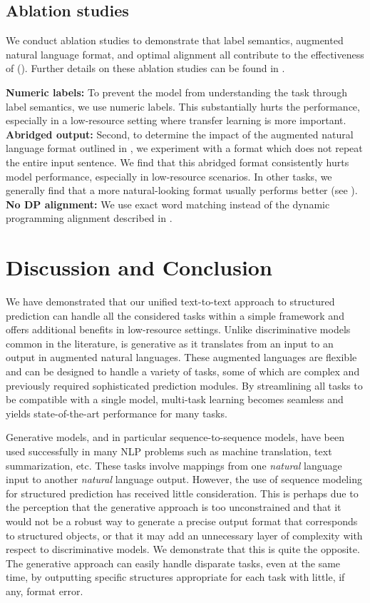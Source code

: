 \subsection{Ablation studies} \label{sec:exp_ablation}
We conduct ablation studies to demonstrate that label semantics, augmented natural language format, and optimal alignment all contribute to the effectiveness of \ourmodel{} ().
Further details on these ablation studies can be found in .

\textbf{Numeric labels:} To prevent the model from understanding the task through label semantics, we use numeric labels. This substantially hurts the performance, especially in a low-resource setting where transfer learning is more important.
\textbf{Abridged output:} Second, to determine the impact of the augmented natural language format outlined in , we experiment with a format which does not repeat the entire input sentence.
We find that this abridged format consistently hurts model performance, especially in low-resource scenarios. 
In other tasks, we generally find that a more natural-looking format usually performs better (see ).
\textbf{No DP alignment:} We use exact word matching instead of the dynamic programming alignment described in .

\section{Discussion and Conclusion} \label{sec:discussion}

We have demonstrated that our unified text-to-text approach to structured prediction can handle all the considered tasks within a simple framework and offers additional benefits in low-resource settings.
Unlike discriminative models common in the literature, \ourmodel{} is generative as it translates from an input to an output in augmented natural languages.
These augmented languages are flexible and can be designed to handle a variety of tasks, some of which are complex and previously required sophisticated prediction modules. %
By streamlining all tasks to be compatible with a single model, multi-task learning becomes seamless and yields state-of-the-art performance for many tasks.

Generative models, and in particular sequence-to-sequence models, have been used successfully in many NLP problems such as machine translation, text summarization, etc. %
These tasks involve mappings from one \emph{natural} language input to another \emph{natural} language output. %
However, the use of sequence modeling for structured prediction has received little consideration.
This is perhaps due to the perception that the generative approach is too unconstrained and that it would not be a robust way to generate a precise output format that corresponds to structured objects, or that it may add an unnecessary layer of complexity with respect to discriminative models.
We demonstrate that this is quite the opposite.
The generative approach can easily handle disparate tasks, even at the same time, by outputting specific structures appropriate for each task with little, if any, format error.

